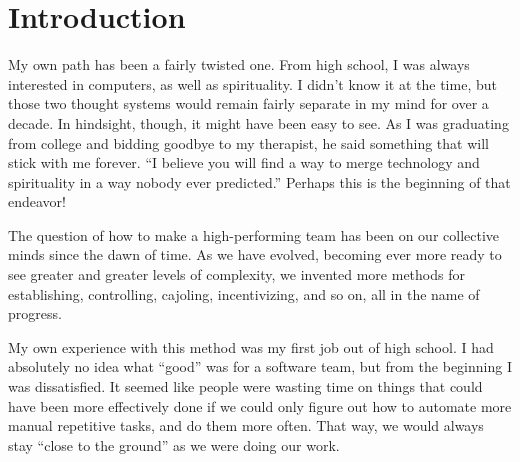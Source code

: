 \chapter{Introduction}

My own path has been a fairly twisted one. From high school, I was always interested in computers, as well as
spirituality. I didn't know it at the time, but those two thought systems would remain fairly separate in my mind
for over a decade. In hindsight, though, it might have been easy to see. As I was graduating from college
and bidding goodbye to my therapist, he said something that will stick with me forever. ``I believe you will find
a way to merge technology and spirituality in a way nobody ever predicted.'' Perhaps this is the beginning
of that endeavor!

The question of how to make a high-performing team has been on our collective minds since the dawn of time.
As we have evolved, becoming ever more ready to see greater and greater levels of complexity, we invented
more methods for establishing, controlling, cajoling, incentivizing, and so on, all in the name of progress.

My own experience with this method was my first job out of high school. I had absolutely no idea what ``good''
was for a software team, but from the beginning I was dissatisfied. It seemed like people were wasting time on 
things that could have been more effectively done if we could only figure out how to automate more manual
repetitive tasks, and do them more often. That way, we would always stay ``close to the ground'' as we were
doing our work.
